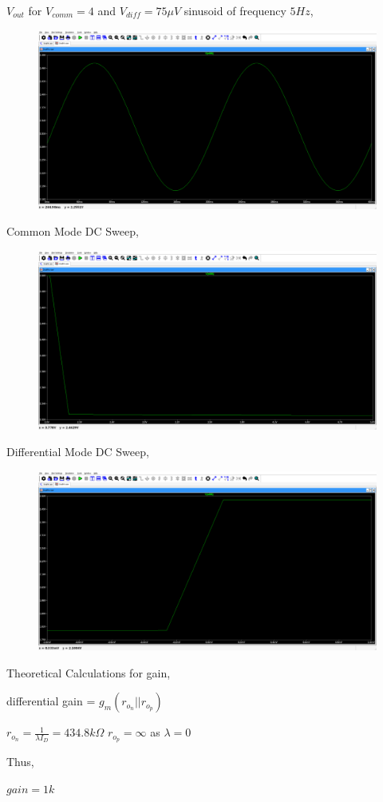 \documentclass{article}
\begin{document}
$V_{out}$ for $V_{comm} = 4$ and $ V_{diff} = 75\mu V$ sinusoid of frequency $5Hz$,

\begin{figure}[H]
    \centering
    \includegraphics[width=0.75\linewidth]{SmallSignal.jpg}
\end{figure}

Common Mode DC Sweep,

\begin{figure}[H]
    \centering
    \includegraphics[width=0.75\linewidth]{CommonDC.jpg}
\end{figure}

Differential Mode DC Sweep,

\begin{figure}[H]
    \centering
    \includegraphics[width=0.75\linewidth]{DifferenceDC.jpg}
\end{figure}

Theoretical Calculations for gain,

differential gain = $g_m(r_{o_n}||r_{o_p})$


$r_{o_n} = \frac{1}{\lambda I_D} = 434.8k\Omega$
$r_{o_p} = \infty$ as $\lambda = 0$

Thus,

$gain = 1k$
\end{document}

